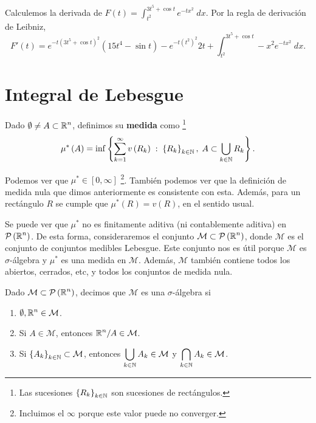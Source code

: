 \begin{eg}
Calculemos la derivada de $\displaystyle F\left(t\right)=\int^{3t ^{5}+\cos t}_{t ^{2}} e^{-tx^{2}} \; dx $. Por la regla de derivación de Leibniz,
\[F'\left(t\right)=e^{-t\left(3t ^{5}+\cos t\right)^{2}}\left(15 t ^{4}-\sin t\right)-e^{-t\left(t ^{2}\right)^{2}}2t +\int^{3t ^{5}+\cos t}_{t ^{2}} -x^{2}e^{-tx^{2}} \; dx.\]
\end{eg}

\section{Integral de Lebesgue}
\begin{definition}
	Dado $\displaystyle \emptyset\neq A \subset \mathbb{R}^{n} $, definimos su \textbf{medida} como \footnote{Las sucesiones $\displaystyle \left\{ R_{k}\right\} _{k \in \mathbb{N}} $ son sucesiones de rectángulos.} 
\[\mu^{*}\left(A\right)=\inf \left\{ \sum^{\infty}_{k = 1}v\left(R_{k}\right)\; : \; \left\{ R_{k}\right\} _{k \in \mathbb{N}}, \; A \subset \bigcup_{k \in \mathbb{N}}R_{k}\right\}  .\]
\end{definition}
\begin{observation}
	Podemos ver que $\displaystyle \mu^{*} \in [0,\infty]$ \footnote{Incluimos el $\displaystyle \infty $ porque este valor puede no converger.}. También podemos ver que la definición de medida nula que dimos anteriormente es consistente con esta. Además, para un rectángulo $\displaystyle R $ se cumple que $\displaystyle \mu^{*}\left(R\right)=v\left(R\right) $, en el sentido usual.	
\end{observation}
Se puede ver que $\displaystyle \mu^{*} $ no es finitamente aditiva (ni contablemente aditiva) en $\displaystyle \mathcal{P}\left(\mathbb{R}^{n}\right) $. De esta forma, consideraremos el conjunto $\displaystyle \mathcal{M}\subset\mathcal{P}\left(\mathbb{R}^{n}\right) $, donde $\displaystyle \mathcal{M} $ es el conjunto de conjuntos medibles Lebesgue. Este conjunto nos es útil porque $\displaystyle \mathcal{M} $ es $\displaystyle \sigma  $-álgebra y $\displaystyle \mu^{*} $ es una medida en $\displaystyle \mathcal{M} $. Además, $\displaystyle \mathcal{M} $ también contiene todos los abiertos, cerrados, etc, y todos los conjuntos de medida nula.
\begin{definition}
Dado $\displaystyle \mathcal{M}\subset\mathcal{P}\left(\mathbb{R}^{n}\right) $, decimos que $\displaystyle \mathcal{M} $ es una $\displaystyle \sigma  $-álgebra si
\begin{enumerate}
\item $\displaystyle \emptyset, \mathbb{R}^{n} \in \mathcal{M} $. 
\item Si $\displaystyle A \in \mathcal{M} $, entonces $\displaystyle \mathbb{R}^{n}/A \in \mathcal{M} $. 
\item Si $\displaystyle \left\{ A_{k}\right\} _{k \in \mathbb{N}}\subset \mathcal{M} $, entonces $\displaystyle \bigcup_{k \in \mathbb{N}}A_{k} \in \mathcal{M} $ y $\displaystyle \bigcap_{k \in \mathbb{N}}A_{k}\in \mathcal{M} $. 
\end{enumerate}
\end{definition}

